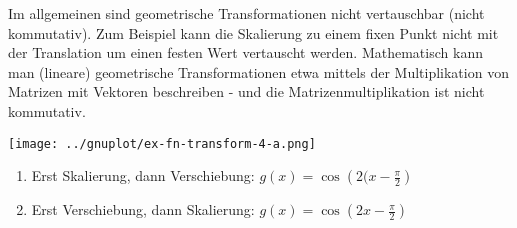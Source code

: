 \item Im allgemeinen sind geometrische Transformationen nicht vertauschbar (nicht kommutativ). Zum Beispiel kann die Skalierung zu einem fixen Punkt nicht mit der Translation um einen festen Wert vertauscht werden. Mathematisch kann man (lineare) geometrische Transformationen etwa mittels der Multiplikation von Matrizen mit Vektoren beschreiben - und die Matrizenmultiplikation ist nicht kommutativ.

\begin{center}
\texttt{[image: ../gnuplot/ex-fn-transform-4-a.png]}
\end{center}

\begin{enumerate}
\item Erst Skalierung, dann Verschiebung: $g(x) = \cos\left(2(x-\frac{\pi}{2}\right)$
\item Erst Verschiebung, dann Skalierung: $g(x) = \cos\left(2x-\frac{\pi}{2}\right)$
\end{enumerate}
